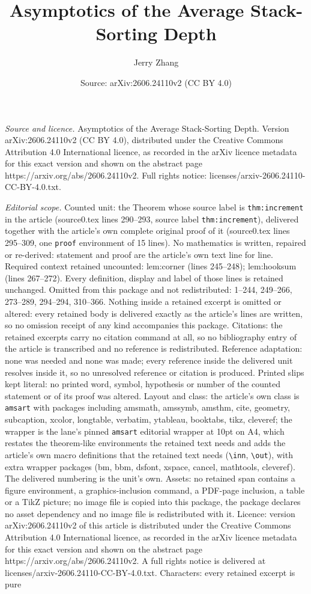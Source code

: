 \documentclass[10pt,a4paper]{amsart}
\title[Asymptotics of the Average Stack-Sorting Depth]{Asymptotics of the Average Stack-Sorting Depth}
\author{Jerry Zhang}
\date{Source: arXiv:2606.24110v2 (CC BY 4.0)}
\begin{document}
\maketitle

\noindent\emph{Source and licence.} Asymptotics of the Average Stack-Sorting Depth. Version arXiv:2606.24110v2 (CC BY 4.0), distributed under the Creative Commons Attribution 4.0 International licence, as recorded in the arXiv licence metadata for this exact version and shown on the abstract page https://arxiv.org/abs/2606.24110v2. Full rights notice: licenses/arxiv-2606.24110-CC-BY-4.0.txt.\par\smallskip

\noindent\textit{Editorial scope.} Counted unit: the Theorem whose source label is \texttt{thm:increment} in the article (source0.tex lines 290--293, source label \texttt{thm:increment}), delivered together with the article's own complete original proof of it (source0.tex lines 295--309, one \texttt{proof} environment of 15 lines). No mathematics is written, repaired or re-derived: statement and proof are the article's own text line for line. Required context retained uncounted: lem:corner (lines 245--248); lem:hooksum (lines 267--272). Every definition, display and label of those lines is retained unchanged. Omitted from this package and not redistributed: 1--244, 249--266, 273--289, 294--294, 310--366. Nothing inside a retained excerpt is omitted or altered: every retained body is delivered exactly as the article's lines are written, so no omission receipt of any kind accompanies this package. Citations: the retained excerpts carry no citation command at all, so no bibliography entry of the article is transcribed and no reference is redistributed. Reference adaptation: none was needed and none was made; every reference inside the delivered unit resolves inside it, so no unresolved reference or citation is produced. Printed slips kept literal: no printed word, symbol, hypothesis or number of the counted statement or of its proof was altered. Layout and class: the article's own class is \texttt{amsart} with packages including amsmath, amssymb, amsthm, cite, geometry, subcaption, xcolor, longtable, verbatim, ytableau, booktabs, tikz, cleveref; the wrapper is the lane's pinned \texttt{amsart} editorial wrapper at 10pt on A4, which restates the theorem-like environments the retained text needs and adds the article's own macro definitions that the retained text needs (\texttt{\textbackslash inn}, \texttt{\textbackslash out}), with extra wrapper packages (bm, bbm, dsfont, xspace, cancel, mathtools, cleveref). The delivered numbering is the unit's own. Assets: no retained span contains a figure environment, a graphics-inclusion command, a PDF-page inclusion, a table or a TikZ picture; no image file is copied into this package, the package declares no asset dependency and no image file is redistributed with it. Licence: version arXiv:2606.24110v2 of this article is distributed under the Creative Commons Attribution 4.0 International licence, as recorded in the arXiv licence metadata for this exact version and shown on the abstract page https://arxiv.org/abs/2606.24110v2. A full rights notice is delivered at licenses/arxiv-2606.24110-CC-BY-4.0.txt. Characters: every retained excerpt is pure 
\end{document}
